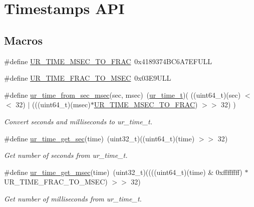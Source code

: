 \hypertarget{group__ur__time}{}\section{Timestamps A\+PI}
\label{group__ur__time}
\subsection*{Macros}
\begin{DoxyCompactItemize}
\item 
\#define \hyperlink{group__ur__time_ga52573ceb442ad4fbd35d76f244048ec3}{U\+R\+\_\+\+T\+I\+M\+E\+\_\+\+M\+S\+E\+C\+\_\+\+T\+O\+\_\+\+F\+R\+AC}~0x4189374\+B\+C6\+A7\+E\+F\+U\+LL
\item 
\#define \hyperlink{group__ur__time_ga6decebb086670b8be48b9a3e185d1cb7}{U\+R\+\_\+\+T\+I\+M\+E\+\_\+\+F\+R\+A\+C\+\_\+\+T\+O\+\_\+\+M\+S\+EC}~0x03\+E9\+U\+LL
\item 
\#define \hyperlink{group__ur__time_ga8a7a7eb122f30c16d0b3c18bbf313d50}{ur\+\_\+time\+\_\+from\+\_\+sec\+\_\+msec}(sec,  msec)~(\hyperlink{group__ur__time_ga9d13a2ac3696e74a33a93aa0461a3899}{ur\+\_\+time\+\_\+t})( ((uint64\+\_\+t)(sec) $<$$<$ 32) $\vert$ (((uint64\+\_\+t)(msec)$\ast$\hyperlink{group__ur__time_ga52573ceb442ad4fbd35d76f244048ec3}{U\+R\+\_\+\+T\+I\+M\+E\+\_\+\+M\+S\+E\+C\+\_\+\+T\+O\+\_\+\+F\+R\+AC}) $>$$>$ 32) )
\begin{DoxyCompactList}\small\item\em Convert seconds and milliseconds to ur\+\_\+time\+\_\+t. \end{DoxyCompactList}\item 
\#define \hyperlink{group__ur__time_ga19172b0ee74eb297f1f54bc868e50667}{ur\+\_\+time\+\_\+get\+\_\+sec}(time)~(uint32\+\_\+t)((uint64\+\_\+t)(time) $>$$>$ 32)
\begin{DoxyCompactList}\small\item\em Get number of seconds from ur\+\_\+time\+\_\+t. \end{DoxyCompactList}\item 
\#define \hyperlink{group__ur__time_ga427dae14973a034c807ed2603fee1f6e}{ur\+\_\+time\+\_\+get\+\_\+msec}(time)~(uint32\+\_\+t)((((uint64\+\_\+t)(time) \& 0xffffffff) $\ast$ U\+R\+\_\+\+T\+I\+M\+E\+\_\+\+F\+R\+A\+C\+\_\+\+T\+O\+\_\+\+M\+S\+E\+C) $>$$>$ 32)
\begin{DoxyCompactList}\small\item\em Get number of milliseconds from ur\+\_\+time\+\_\+t. \end{DoxyCompactList}\end{DoxyCompactItemize}
